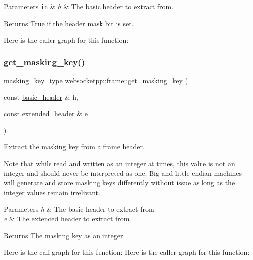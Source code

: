 \begin{DoxyParams}[1]{Parameters}
\mbox{\tt in}  & {\em h} & The basic header to extract from. \\
\hline
\end{DoxyParams}
\begin{DoxyReturn}{Returns}
\mbox{\hyperlink{struct_true}{True}} if the header mask bit is set. 
\end{DoxyReturn}
Here is the caller graph for this function\+:
\mbox{\label{namespacewebsocketpp_1_1frame_aed7edd146ce3aa5b87adc9fcc5fcb10f}} 
\subsubsection{\texorpdfstring{get\+\_\+masking\+\_\+key()}{get\_masking\_key()}}
{\footnotesize\ttfamily \mbox{\hyperlink{unionwebsocketpp_1_1frame_1_1uint32__converter}{masking\+\_\+key\+\_\+type}} websocketpp\+::frame\+::get\+\_\+masking\+\_\+key (\begin{DoxyParamCaption}\item[{const \mbox{\hyperlink{structwebsocketpp_1_1frame_1_1basic__header}{basic\+\_\+header}} \&}]{h,  }\item[{const \mbox{\hyperlink{structwebsocketpp_1_1frame_1_1extended__header}{extended\+\_\+header}} \&}]{e }\end{DoxyParamCaption})\hspace{0.3cm}{\ttfamily [inline]}}



Extract the masking key from a frame header. 

Note that while read and written as an integer at times, this value is not an integer and should never be interpreted as one. Big and little endian machines will generate and store masking keys differently without issue as long as the integer values remain irrelivant.


\begin{DoxyParams}{Parameters}
{\em h} & The basic header to extract from \\
\hline
{\em e} & The extended header to extract from\\
\hline
\end{DoxyParams}
\begin{DoxyReturn}{Returns}
The masking key as an integer. 
\end{DoxyReturn}
Here is the call graph for this function\+:
Here is the caller graph for this function\+:
\mbox{\label{namespacewebsocketpp_1_1frame_a001d6c5e538d5eb1ef5ddc21aeb61ee3}} 
